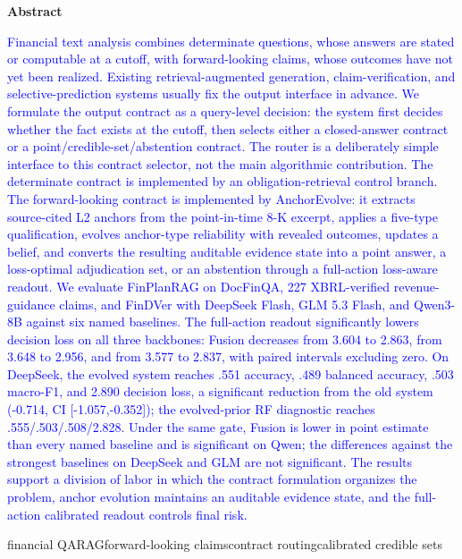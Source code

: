\documentclass[12pt,openany]{ctexbook}
\newcommand{\rev}[1]{\textcolor{blue}{#1}}
\begin{document}
\clearpage
{}
{}
\begin{center}{\arial\bfseries{} Abstract\par}\end{center}
\vspace{0.6cm}
{\arial{}\selectfont\sloppy
\setlength{\parindent}{0pt}
\setlength{\emergencystretch}{3em}
\hspace*{2em}\rev{Financial text analysis combines determinate questions, whose answers are stated or computable at a cutoff, with forward-looking claims, whose outcomes have not yet been realized. Existing retrieval-augmented generation, claim-verification, and selective-prediction systems usually fix the output interface in advance. We formulate the output contract as a query-level decision: the system first decides whether the fact exists at the cutoff, then selects either a closed-answer contract or a point/credible-set/abstention contract. The router is a deliberately simple interface to this contract selector, not the main algorithmic contribution. The determinate contract is implemented by an obligation-retrieval control branch. The forward-looking contract is implemented by AnchorEvolve: it extracts source-cited L2 anchors from the point-in-time 8-K excerpt, applies a five-type qualification, evolves anchor-type reliability with revealed outcomes, updates a belief, and converts the resulting auditable evidence state into a point answer, a loss-optimal adjudication set, or an abstention through a full-action loss-aware readout.}
\hspace*{2em}\rev{We evaluate FinPlanRAG on DocFinQA, 227 XBRL-verified revenue-guidance claims, and FinDVer with DeepSeek Flash, GLM 5.3 Flash, and Qwen3-8B against six named baselines. The full-action readout significantly lowers decision loss on all three backbones: Fusion decreases from 3.604 to 2.863, from 3.648 to 2.956, and from 3.577 to 2.837, with paired intervals excluding zero. On DeepSeek, the evolved system reaches .551 accuracy, .489 balanced accuracy, .503 macro-F1, and 2.890 decision loss, a significant reduction from the old system (-0.714, CI [-1.057,-0.352]); the evolved-prior RF diagnostic reaches .555/.503/.508/2.828. Under the same gate, Fusion is lower in point estimate than every named baseline and is significant on Qwen; the differences against the strongest baselines on DeepSeek and GLM are not significant. The results support a division of labor in which the contract formulation organizes the problem, anchor evolution maintains an auditable evidence state, and the full-action calibrated readout controls final risk.}
}
\vspace{0.4cm}
{\sloppy{} {\arial{}\selectfont financial QA\hspace{0.8em}RAG\hspace{0.8em}forward-looking claims\hspace{0.8em}contract routing\hspace{0.8em}calibrated credible sets}\par}
\end{document}
